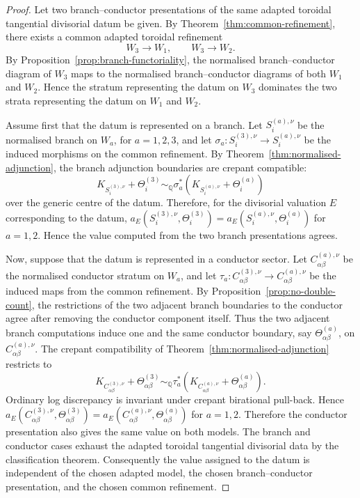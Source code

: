 \documentclass[11pt]{amsart}
\numberwithin{equation}{section}
\theoremstyle{plain}
\theoremstyle{definition}
\begin{document}
\begin{proof}
Let two branch--conductor presentations of the same adapted toroidal tangential divisorial datum be given. By Theorem~\ref{thm:common-refinement}, there exists a common adapted toroidal refinement
\[
W_3\longrightarrow W_1,
\qquad
W_3\longrightarrow W_2.
\]
By Proposition~\ref{prop:branch-functoriality}, the normalised branch--conductor diagram of \(W_3\) maps to the normalised branch--conductor diagrams of both \(W_1\) and \(W_2\). Hence the stratum representing the datum on \(W_3\) dominates the two strata representing the datum on \(W_1\) and \(W_2\).

Assume first that the datum is represented on a branch. Let \(S_i^{(a),\nu}\) be the normalised branch on \(W_a\), for \(a=1,2,3\), and let
$
\sigma_a:S_i^{(3),\nu}\longrightarrow S_i^{(a),\nu}
$
be the induced morphisms on the common refinement. By Theorem~\ref{thm:normalised-adjunction}, the branch adjunction boundaries are crepant compatible:
\[
K_{S_i^{(3),\nu}}+\Theta_i^{(3)}
\sim_{\mathbb Q}
\sigma_a^*(K_{S_i^{(a),\nu}}+\Theta_i^{(a)})
\]
over the generic centre of the datum. Therefore, for the divisorial valuation \(E\) corresponding to the datum,
$
a_E(S_i^{(3),\nu},\Theta_i^{(3)})
=
a_E(S_i^{(a),\nu},\Theta_i^{(a)})
$
for \(a=1,2\). Hence the value computed from the two branch presentations agrees.

Now, suppose that the datum is represented in a conductor sector. Let \(C_{\alpha\beta}^{(a),\nu}\) be the normalised conductor stratum on \(W_a\), and let
$
\tau_a:C_{\alpha\beta}^{(3),\nu}\longrightarrow C_{\alpha\beta}^{(a),\nu}
$
be the induced maps from the common refinement. By Proposition~\ref{prop:no-double-count}, the restrictions of the two adjacent branch boundaries to the conductor agree after removing the conductor component itself. Thus the two adjacent branch computations induce one and the same conductor boundary, say \(\Theta_{\alpha\beta}^{(a)}\), on \(C_{\alpha\beta}^{(a),\nu}\). The crepant compatibility of Theorem~\ref{thm:normalised-adjunction} restricts to
\[
K_{C_{\alpha\beta}^{(3),\nu}}+\Theta_{\alpha\beta}^{(3)}
\sim_{\mathbb Q}
\tau_a^*(K_{C_{\alpha\beta}^{(a),\nu}}+\Theta_{\alpha\beta}^{(a)}).
\]
Ordinary log discrepancy is invariant under crepant birational pull-back. Hence
$
a_E(C_{\alpha\beta}^{(3),\nu},\Theta_{\alpha\beta}^{(3)})
=
a_E(C_{\alpha\beta}^{(a),\nu},\Theta_{\alpha\beta}^{(a)})
$
for \(a=1,2\). Therefore the conductor presentation also gives the same value on both models.
The branch and conductor cases exhaust the adapted toroidal tangential divisorial data by the classification theorem. Consequently the value assigned to the datum is independent of the chosen adapted model, the chosen branch--conductor presentation, and the chosen common refinement.
\end{proof}
\end{document}
